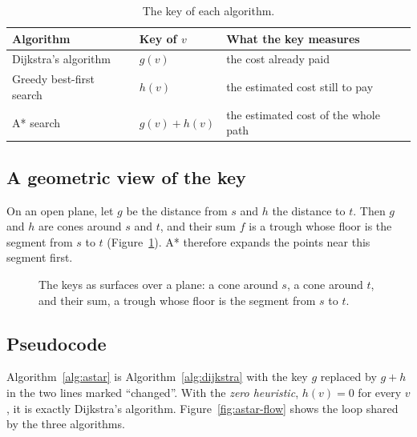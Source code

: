 \begin{table}[htbp]
  \centering
  \caption{The key of each algorithm.}\label{tab:three-keys}
  \begin{tabular}{@{}lll@{}}
    \toprule
    Algorithm & Key of $v$ & What the key measures\\
    \midrule
    Dijkstra's algorithm     & $g(v)$        & the cost already paid\\
    Greedy best-first search & $h(v)$        & the estimated cost still to pay\\
    A* search                & $g(v) + h(v)$ & the estimated cost of the whole path\\
    \bottomrule
  \end{tabular}
\end{table}

\subsection{A geometric view of the key}\label{sec:geometry}

On an open plane, let $g$ be the distance from $s$ and $h$ the distance to $t$.
Then $g$ and $h$ are cones around $s$ and $t$, and their sum $f$ is a trough
whose floor is the segment from $s$ to $t$ (Figure~\ref{fig:surfaces}). A*
therefore expands the points near this segment first.

\begin{figure}[htbp]
  \centering
  \resizebox{\linewidth}{!}{}
  \caption{The keys as surfaces over a plane: a cone around $s$, a cone around
    $t$, and their sum, a trough whose floor is the segment from $s$ to
    $t$.}\label{fig:surfaces}
\end{figure}

\subsection{Pseudocode}\label{sec:astar-alg}

Algorithm~\ref{alg:astar} is Algorithm~\ref{alg:dijkstra} with the key $g$
replaced by $g + h$ in the two lines marked ``changed''. With the \emph{zero
heuristic}, $h(v) = 0$ for every $v$, it is exactly Dijkstra's algorithm.
Figure~\ref{fig:astar-flow} shows the loop shared by the three algorithms.


